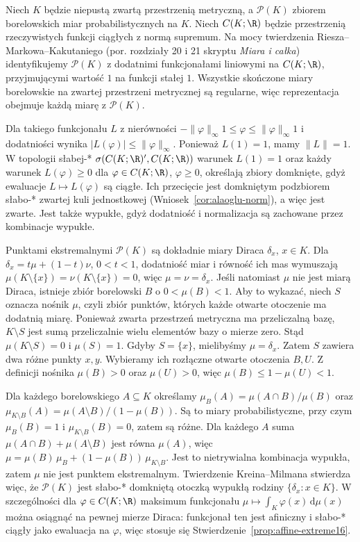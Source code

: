\begin{przyklad}
\label{ex:prob-measures16}
Niech $K$ będzie niepustą zwartą przestrzenią metryczną,
a $\mathcal P(K)$ zbiorem borelowskich miar probabilistycznych na $K$.
Niech $C(K;\R)$ będzie przestrzenią rzeczywistych funkcji
ciągłych z normą supremum. Na mocy twierdzenia
Riesza--Markowa--Kakutaniego (por. rozdziały 20 i 21
skryptu \emph{Miara i całka}) identyfikujemy $\mathcal P(K)$
z dodatnimi funkcjonałami liniowymi na $C(K;\R)$,
przyjmującymi wartość $1$ na funkcji stałej $1$.
Wszystkie skończone miary borelowskie na zwartej przestrzeni
metrycznej są regularne, więc reprezentacja obejmuje każdą
miarę z $\mathcal P(K)$.

Dla takiego funkcjonału $L$ z nierówności
$-\|\varphi\|_\infty 1\le\varphi\le\|\varphi\|_\infty 1$
i dodatniości wynika $|L(\varphi)|\le\|\varphi\|_\infty$.
Ponieważ $L(1)=1$, mamy $\|L\|=1$.
W topologii słabej-* $\sigma(C(K;\R)',C(K;\R))$
warunek $L(1)=1$ oraz każdy warunek $L(\varphi)\ge0$
dla $\varphi\in C(K;\R)$, $\varphi\ge0$, określają zbiory
domknięte, gdyż ewaluacje $L\mapsto L(\varphi)$ są ciągłe.
Ich przecięcie jest domkniętym podzbiorem słabo-* zwartej
kuli jednostkowej (Wniosek~\ref{cor:alaoglu-norm}),
a więc jest zwarte. Jest także wypukłe, gdyż dodatniość
i normalizacja są zachowane przez kombinacje wypukłe.

Punktami ekstremalnymi $\mathcal P(K)$ są dokładnie
miary Diraca $\delta_x$, $x\in K$.
Dla $\delta_x=t\mu+(1-t)\nu$, $0<t<1$, dodatniość
miar i równość ich mas wymuszają
$\mu(K\setminus\{x\})=\nu(K\setminus\{x\})=0$,
więc $\mu=\nu=\delta_x$.
Jeśli natomiast $\mu$ nie jest miarą Diraca,
istnieje zbiór borelowski $B$ o $0<\mu(B)<1$.
Aby to wykazać, niech $S$ oznacza nośnik $\mu$, czyli zbiór
punktów, których każde otwarte otoczenie ma dodatnią miarę.
Ponieważ zwarta przestrzeń metryczna ma przeliczalną bazę,
$K\setminus S$ jest sumą przeliczalnie wielu elementów bazy
o mierze zero. Stąd $\mu(K\setminus S)=0$ i $\mu(S)=1$.
Gdyby $S=\{x\}$, mielibyśmy $\mu=\delta_x$.
Zatem $S$ zawiera dwa różne punkty $x,y$.
Wybieramy ich rozłączne otwarte otoczenia $B,U$.
Z definicji nośnika $\mu(B)>0$ oraz $\mu(U)>0$,
więc $\mu(B)\le1-\mu(U)<1$.

Dla każdego borelowskiego $A\subseteq K$ określamy
$\mu_B(A)=\mu(A\cap B)/\mu(B)$ oraz
$\mu_{K\setminus B}(A)=\mu(A\setminus B)/(1-\mu(B))$.
Są to miary probabilistyczne, przy czym
$\mu_B(B)=1$ i $\mu_{K\setminus B}(B)=0$, zatem są różne.
Dla każdego $A$ suma $\mu(A\cap B)+\mu(A\setminus B)$
jest równa $\mu(A)$, więc
$\mu=\mu(B)\,\mu_B+(1-\mu(B))\,\mu_{K\setminus B}$.
Jest to nietrywialna kombinacja wypukła, zatem $\mu$
nie jest punktem ekstremalnym.
Twierdzenie Kreina--Milmana stwierdza więc, że
$\mathcal P(K)$ jest słabo-* domkniętą otoczką wypukłą
rodziny $\{\delta_x:x\in K\}$.
W szczególności dla $\varphi\in C(K;\R)$
maksimum funkcjonału $\mu\mapsto\int_K\varphi(x)\,\mathrm d\mu(x)$
można osiągnąć na pewnej mierze Diraca: funkcjonał ten
jest afiniczny i słabo-* ciągły jako ewaluacja na $\varphi$,
więc stosuje się Stwierdzenie~\ref{prop:affine-extreme16}.
\end{przyklad}

